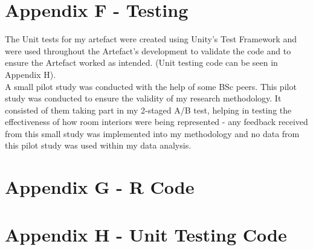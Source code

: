 \newpage
\section*{Appendix F - Testing} \label{append:f}
The Unit tests for my artefact were created using Unity's Test Framework and were used throughout the Artefact's development to validate the code and to ensure the Artefact worked as intended. (Unit testing code can be seen in Appendix H).
\\
A small pilot study was conducted with the help of some BSc peers. This pilot study was conducted to ensure the validity of my research methodology. It consisted of them taking part in my 2-staged A/B test, helping in testing the effectiveness of how room interiors were being represented - any feedback received from this small study was implemented into my methodology and no data from this pilot study was used within my data analysis.

\newpage
\section*{Appendix G - R Code} \label{append:g}

\newpage
\section*{Appendix H - Unit Testing Code} \label{append:h}
